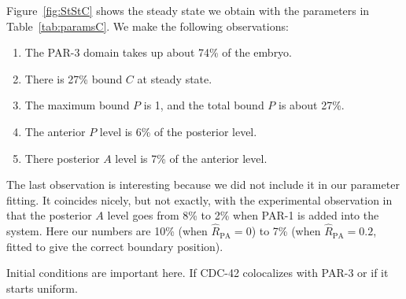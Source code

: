 \documentclass[11pt]{article}
\newcommand{\red}[1]{\color{red}#1\normalcolor}
\newcommand{\6}[1]{#1_{\text{6}}}
\newcommand{\3}[1]{#1_{\text{3}}}
\begin{document}
Figure\ \ref{fig:StStC} shows the steady state we obtain with the parameters in Table\ \ref{tab:paramsC}. We make the following observations:
\begin{enumerate}
\item The PAR-3 domain takes up about 74\% of the embryo. 
\item There is 27\% bound $C$ at steady state.
\item The maximum bound $P$ is 1, and the total bound $P$ is about 27\%. 
\item The anterior $P$ level is 6\% of the posterior level. 
\item There posterior $A$ level is 7\% of the anterior level. 
\end{enumerate}
The last observation is interesting because we did not include it in our parameter fitting. It coincides nicely, but not exactly, with the experimental observation in \cite[Fig.~4C]{sailer2015dynamic} that the posterior $A$ level goes from 8\% to 2\% when PAR-1 is added into the system. Here our numbers are 10\% (when $\hat R_\text{PA}=0$) to 7\% (when $\hat R_\text{PA}=0.2$, fitted to give the correct boundary position). 

\red{Initial conditions are important here. If CDC-42 colocalizes with PAR-3 or if it starts uniform.}
\end{document}
